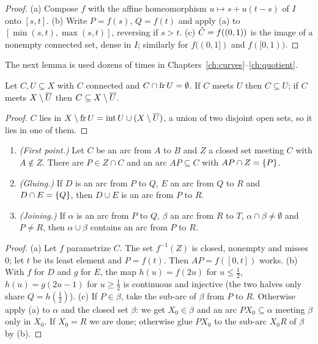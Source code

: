 \begin{proof}
(a) Compose $f$ with the affine homeomorphism $u\mapsto s+u(t-s)$ of $I$ onto $[s,t]$. (b) Write
$P=f(s)$, $Q=f(t)$ and apply (a) to $[\min(s,t),\max(s,t)]$, reversing if $s>t$. (c)
$\mathring{C}=f((0,1))$ is the image of a nonempty connected set, dense in $I$; similarly for
$f((0,1])$ and $f([0,1))$.
\end{proof}


The next lemma is used dozens of times in Chapters~\ref{ch:curves}--\ref{ch:quotient}.

\begin{lemma}\label{lem:conn-frontier}
Let $C,U\subseteq X$ with $C$ connected and $C\cap\operatorname{fr} U=\emptyset$. If $C$ meets $U$ then
$C\subseteq U$; if $C$ meets $X\setminus\overline{U}$ then $C\subseteq X\setminus\overline{U}$.
\end{lemma}

\begin{proof}
$C$ lies in $X\setminus\operatorname{fr} U=\operatorname{int} U\cup(X\setminus\overline{U})$, a union of two disjoint open sets,
so it lies in one of them.
\end{proof}


\begin{lemma}\label{lem:arc-ops}
\leavevmode
\begin{enumerate}[label=(\alph*)]
\item \emph{(First point.)} Let $C$ be an arc from $A$ to $B$ and $Z$ a closed set meeting $C$ with
$A\notin Z$. There are $P\in Z\cap C$ and an arc $AP\subseteq C$ with $AP\cap Z=\left\{ P \right\}$.
\item \emph{(Gluing.)} If $D$ is an arc from $P$ to $Q$, $E$ an arc from $Q$ to $R$ and
$D\cap E=\left\{ Q \right\}$, then $D\cup E$ is an arc from $P$ to $R$.
\item \emph{(Joining.)} If $\alpha$ is an arc from $P$ to $Q$, $\beta$ an arc from $R$ to $T$,
$\alpha\cap\beta\ne\emptyset$ and $P\ne R$, then $\alpha\cup\beta$ contains an arc from $P$ to
$R$.
\end{enumerate}
\end{lemma}

\begin{proof}
(a) Let $f$ parametrize $C$. The set $f^{-1}(Z)$ is closed, nonempty and misses $0$; let $t$ be its
least element and $P=f(t)$. Then $AP=f([0,t])$ works. (b) With $f$ for $D$ and $g$ for $E$, the map
$h(u)=f(2u)$ for $u\le\frac12$, $h(u)=g(2u-1)$ for $u\ge\frac12$ is continuous and injective (the
two halves only share $Q=h(\frac12)$). (c) If $P\in\beta$, take the sub-arc of $\beta$ from $P$ to
$R$. Otherwise apply (a) to $\alpha$ and the closed set $\beta$: we get $X_0\in\beta$ and an arc
$PX_0\subseteq\alpha$ meeting $\beta$ only in $X_0$. If $X_0=R$ we are done; otherwise glue $PX_0$
to the sub-arc $X_0R$ of $\beta$ by (b).
\end{proof}

